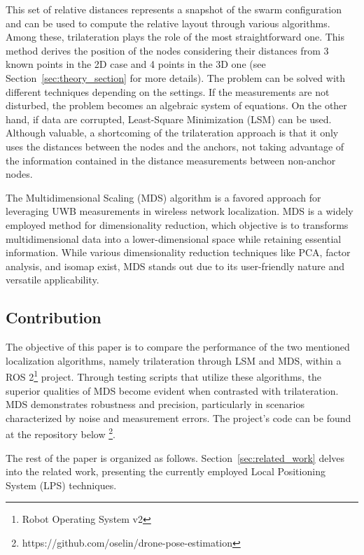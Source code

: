 This set of relative distances represents a snapshot of the swarm configuration and can be used to compute the relative layout through various algorithms. 
Among these, trilateration plays the role of the most straightforward one. This method derives the position of the nodes considering their distances from 3 known points in the 2D case and 4 points in the 3D one (see Section~\ref{sec:theory_section} for more details). 
The problem can be solved with different techniques depending on the settings. If the measurements are not disturbed, the problem becomes an algebraic system of equations. On the other hand, if data are corrupted, Least-Square Minimization (LSM) can be used.
Although valuable, a shortcoming of the trilateration approach is that it only uses the distances between the nodes and the anchors, not taking advantage of the information contained in the distance measurements between non-anchor nodes.
\par

The Multidimensional Scaling (MDS) algorithm is a favored approach for leveraging UWB measurements in wireless network localization. MDS is a widely employed method for dimensionality reduction, which objective is to transforms multidimensional data into a lower-dimensional space while retaining essential information. While various dimensionality reduction techniques like PCA, factor analysis, and isomap exist, MDS stands out due to its user-friendly nature and versatile applicability.
\par

\subsection{Contribution}
The objective of this paper is to compare the performance of the two mentioned localization algorithms, namely trilateration through LSM and MDS, within a ROS 2\footnote{Robot Operating System v2} project. Through testing scripts that utilize these algorithms, the superior qualities of MDS become evident when contrasted with trilateration. MDS demonstrates robustness and precision, particularly in scenarios characterized by noise and measurement errors. 
The project's code can be found at the repository below \footnote{https://github.com/oselin/drone-pose-estimation}.


The rest of the paper is organized as follows. Section~\ref{sec:related_work} delves into the related work, presenting the currently employed Local Positioning System (LPS) techniques.\par

